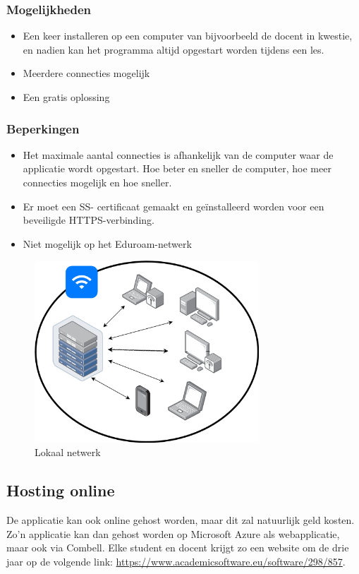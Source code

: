 \subsubsection{Mogelijkheden}
\begin{itemize}
    \item Een keer installeren op een computer van bijvoorbeeld de docent in kwestie, en nadien kan het programma altijd opgestart worden tijdens een les.
    \item Meerdere connecties mogelijk
    \item Een gratis oplossing
\end{itemize}
\subsubsection{Beperkingen}
\begin{itemize}
    \item Het maximale aantal connecties is afhankelijk van de computer waar de applicatie wordt opgestart. Hoe beter en sneller de computer, hoe meer connecties mogelijk en hoe sneller.
    \item Er moet een SS- certificaat gemaakt en geïnstalleerd worden voor een beveiligde HTTPS-verbinding.
    \item Niet mogelijk op het Eduroam-netwerk
\end{itemize}

\begin{figure}
    \centering
    \includegraphics[width=0.75\textwidth]{./img/lokaal_netwerk}
    \caption{\label{fig:lokaal_netwerk} Lokaal netwerk}
\end{figure}

\subsection{Hosting online}
De applicatie kan ook online gehost worden, maar dit zal natuurlijk geld kosten. Zo'n applicatie kan dan gehost worden op Microsoft Azure als webapplicatie, maar ook via Combell. Elke student en docent krijgt zo een website om de drie jaar op de volgende link: \url{https://www.academicsoftware.eu/software/298/857}.
